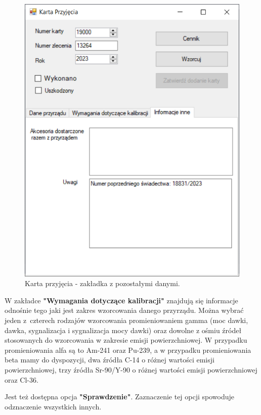  \begin{figure}[htb]
 	\centering
 	\includegraphics{obrazki/Biuro/karta/karta_dane_inne.png}
 	\caption{Karta przyjęcia - zakładka z pozostałymi danymi.}
 	\label{kartaDaneInne}
 \end{figure}

W zakładce \textbf{"Wymagania dotyczące kalibracji"} znajdują się informacje odnośnie tego jaki jest zakres wzorcowania danego przyrządu. Można wybrać jeden z~czterech rodzajów wzorcowania promieniowaniem gamma (moc dawki, dawka, sygnalizacja i sygnalizacja mocy dawki) oraz dowolne z ośmiu źródeł stosowanych do wzorcowania w zakresie emisji powierzchniowej. W przypadku promieniowania alfa są to Am-241 oraz Pu-239, a w przypadku promieniowania beta mamy do dyspozycji, dwa źródła C-14 o różnej wartości emisji powierzchniowej, trzy źródła Sr-90/Y-90 o różnej wartości emisji powierzchniowej oraz Cl-36. 

Jest też dostępna opcja \textbf{"Sprawdzenie"}. Zaznaczenie tej opcji spowoduje odznaczenie wszystkich innych.

